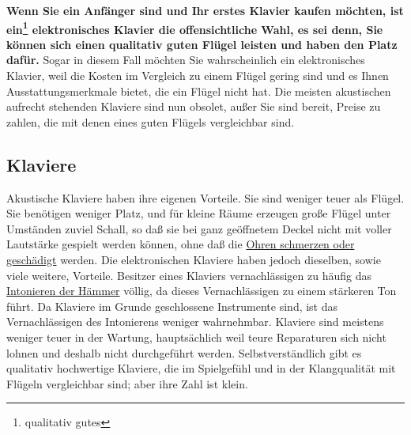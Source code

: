 \textbf{Wenn Sie ein Anfänger sind und Ihr erstes Klavier kaufen möchten, ist ein\footnote{qualitativ gutes} elektronisches Klavier die offensichtliche Wahl, es sei denn, Sie können sich einen qualitativ guten Flügel leisten und haben den Platz dafür.}
Sogar in diesem Fall möchten Sie wahrscheinlich ein elektronisches Klavier, weil die Kosten im Vergleich zu einem Flügel gering sind und es Ihnen Ausstattungsmerkmale bietet, die ein Flügel nicht hat.
Die meisten akustischen aufrecht stehenden Klaviere sind nun obsolet, außer Sie sind bereit, Preise zu zahlen, die mit denen eines guten Flügels vergleichbar sind.


\subsection{Klaviere}
\label{c1iii17c}

Akustische Klaviere haben ihre eigenen Vorteile.
Sie sind weniger teuer als Flügel.
Sie benötigen weniger Platz, und für kleine Räume erzeugen große Flügel unter Umständen zuviel Schall, so daß sie bei ganz geöffnetem Deckel nicht mit voller Lautstärke gespielt werden können, ohne daß die \hyperref[c1iii10gehoer]{Ohren schmerzen oder geschädigt} werden.
Die elektronischen Klaviere haben jedoch dieselben, sowie viele weitere, Vorteile.
Besitzer eines Klaviers vernachlässigen zu häufig das \hyperref[c2_7_hamm]{Intonieren der Hämmer} völlig, da dieses Vernachlässigen zu einem stärkeren Ton führt.
Da Klaviere im Grunde geschlossene Instrumente sind, ist das Vernachlässigen des Intonierens weniger wahrnehmbar.
Klaviere sind meistens weniger teuer in der Wartung, hauptsächlich weil teure Reparaturen sich nicht lohnen und deshalb nicht durchgeführt werden.
Selbstverständlich gibt es qualitativ hochwertige Klaviere, die im Spielgefühl und in der Klangqualität mit Flügeln vergleichbar sind; aber ihre Zahl ist klein.

